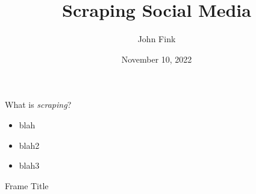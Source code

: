 \documentclass{beamer}
\title{Scraping Social Media}
\author{John Fink}
\date{November 10, 2022}
\begin{document}
\begin{frame}[plain]
    \maketitle
\end{frame}
\begin{frame}{What is \textit{scraping}?}
	\begin{itemize}
		\pause
		\item blah
		\pause
		\item blah2
		\pause
		\item blah3
	\end{itemize}
\end{frame}
\begin{frame}{Frame Title}
\end{frame}
\end{document}
